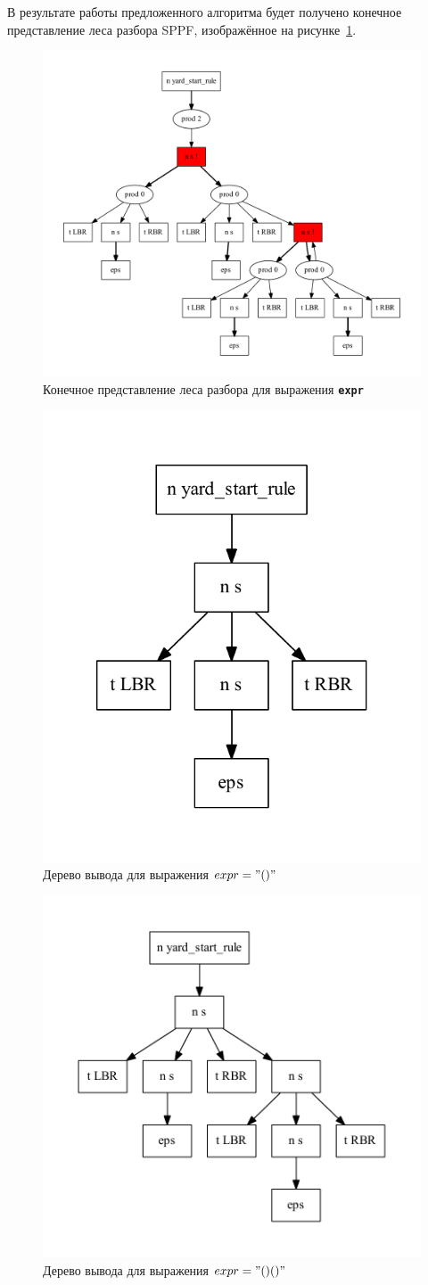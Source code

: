 В результате работы предложенного алгоритма будет получено конечное представление леса разбора SPPF, изображённое на рисунке~\ref{sppf}.

\begin{figure}[!h]
 \centering
 \includegraphics[width=15cm]{pics/sppf.pdf}
 \caption{Конечное представление леса разбора для выражения \textbf{\texttt{expr}}}
 \label{sppf}
\end{figure}

\begin{figure}[!h]
 \centering
 \includegraphics[width=.4\textwidth]{pics/sppf1.pdf}
 \caption{Дерево вывода для выражения $expr="()"$}
 \label{sppf1}
\end{figure}

\begin{figure}[!h]
 \centering
 \includegraphics[width=.5\textwidth]{pics/sppf2.pdf}
 \caption{Дерево вывода для выражения $expr="()()"$}
 \label{sppf2}
\end{figure}

